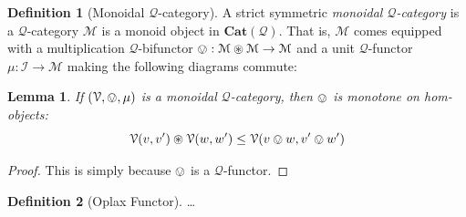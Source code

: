 \documentclass[12pt]{article}
\theoremstyle{definition}
\newtheorem{definition}{Definition}[section]
\theoremstyle{plain}
\newtheorem{lemma}{Lemma}[section]
\theoremstyle{plain}
\theoremstyle{plain}
\theoremstyle{plain}
\theoremstyle{remark}
\theoremstyle{remark}
\newcommand{\mc}[1]{\mathcal{#1}}
\begin{document}
\begin{definition}[Monoidal $\mc{Q}$-category]
	A strict symmetric \emph{monoidal $\mc{Q}$-category} is a $\mc{Q}$-category $\mc{M}$ is a monoid object in $\mathbf{Cat}(\mc{Q})$. That is, $\mc{M}$ comes equipped with a multiplication $\mc{Q}$-bifunctor $\ovee:\mc{M} \circledast \mc{M} \rightarrow \mc{M}$ and a unit $\mc{Q}$-functor $\mu: \mc{I} \rightarrow \mc{M}$ making the following diagrams commute:
	\begin{center}
	\end{center}	 
\end{definition}

\begin{lemma}
	If $(\mc{V}, \ovee, \mu)$ is a monoidal $\mc{Q}$-category, then $\ovee$ is monotone on hom-objects: \[ \mc{V}(v,v') \circledast \mc{V}(w,w') \leq \mc{V}(v \ovee w, v' \ovee w') \]
\end{lemma}
\begin{proof}
	This is simply because $\ovee$ is a $\mc{Q}$-functor.
\end{proof}

\begin{definition}[Oplax Functor]
	\ldots
\end{definition}
\end{document}
